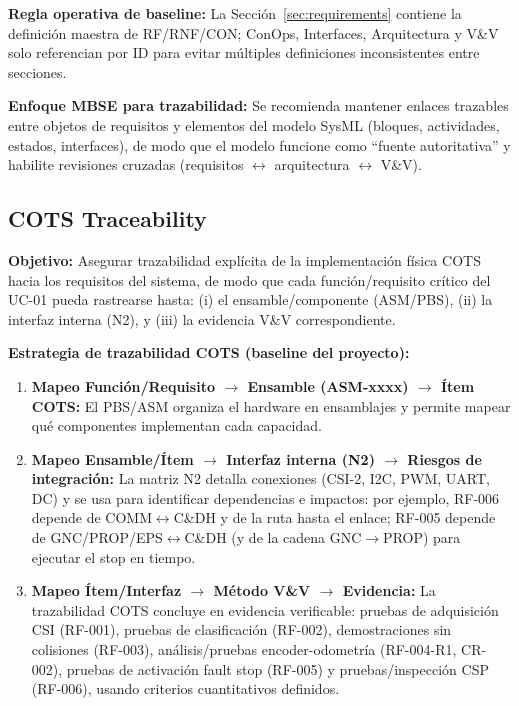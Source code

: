 \textbf{Regla operativa de baseline:} La Sección~\ref{sec:requirements} contiene la definición maestra de RF/RNF/CON; ConOps, Interfaces, Arquitectura y V\&V solo referencian por ID para evitar múltiples definiciones inconsistentes entre secciones.

\textbf{Enfoque MBSE para trazabilidad:} Se recomienda mantener enlaces trazables entre objetos de requisitos y elementos del modelo SysML (bloques, actividades, estados, interfaces), de modo que el modelo funcione como ``fuente autoritativa'' y habilite revisiones cruzadas (requisitos $\leftrightarrow$ arquitectura $\leftrightarrow$ V\&V).

\subsection{COTS Traceability}\label{subsec:cots-traceability}

\textbf{Objetivo:} Asegurar trazabilidad explícita de la implementación física COTS hacia los requisitos del sistema, de modo que cada función/requisito crítico del UC-01 pueda rastrearse hasta: (i) el ensamble/componente (ASM/PBS), (ii) la interfaz interna (N2), y (iii) la evidencia V\&V correspondiente.

\textbf{Estrategia de trazabilidad COTS (baseline del proyecto):}
\begin{enumerate}
  \item \textbf{Mapeo Función/Requisito $\rightarrow$ Ensamble (ASM-xxxx) $\rightarrow$ Ítem COTS:} El PBS/ASM organiza el hardware en ensamblajes y permite mapear qué componentes implementan cada capacidad.
  \item \textbf{Mapeo Ensamble/Ítem $\rightarrow$ Interfaz interna (N2) $\rightarrow$ Riesgos de integración:} La matriz N2 detalla conexiones (CSI-2, I2C, PWM, UART, DC) y se usa para identificar dependencias e impactos: por ejemplo, RF-006 depende de COMM$\leftrightarrow$C\&DH y de la ruta hasta el enlace; RF-005 depende de GNC/PROP/EPS$\leftrightarrow$C\&DH (y de la cadena GNC$\rightarrow$PROP) para ejecutar el stop en tiempo.
  \item \textbf{Mapeo Ítem/Interfaz $\rightarrow$ Método V\&V $\rightarrow$ Evidencia:} La trazabilidad COTS concluye en evidencia verificable: pruebas de adquisición CSI (RF-001), pruebas de clasificación (RF-002), demostraciones sin colisiones (RF-003), análisis/pruebas encoder-odometría (RF-004-R1, CR-002), pruebas de activación fault stop (RF-005) y pruebas/inspección CSP (RF-006), usando criterios cuantitativos definidos.
\end{enumerate}

